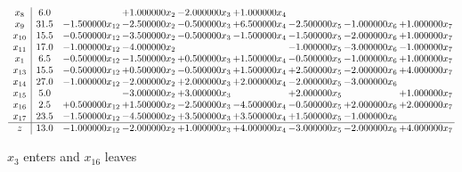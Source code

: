 \documentclass[10pt]{article}
\begin{document}
 \[\begin{array}{c| c c@{\hskip 2pt} c@{\hskip 2pt} c@{\hskip 2pt} c@{\hskip 2pt} c@{\hskip 2pt} c@{\hskip 2pt} c@{\hskip 2pt} }
 x_{8}   &  6.0  &   & + 1.000000 x_{2} & -2.000000 x_{3} & + 1.000000 x_{4} &    &    &   \\
 x_{9}   &  31.5 & -1.500000 x_{12} & -2.500000 x_{2} & -0.500000 x_{3} & + 6.500000 x_{4} & -2.500000 x_{5} & -1.000000 x_{6} & + 1.000000 x_{7}\\
 x_{10}   &  15.5 & -0.500000 x_{12} & -3.500000 x_{2} & -0.500000 x_{3} & -1.500000 x_{4} & -1.500000 x_{5} & -2.000000 x_{6} & + 1.000000 x_{7}\\
 x_{11}   &  17.0 & -1.000000 x_{12} & -4.000000 x_{2} &    &   & -1.000000 x_{5} & -3.000000 x_{6} & -1.000000 x_{7}\\
 x_{1}   &  6.5 & -0.500000 x_{12} & -1.500000 x_{2} & + 0.500000 x_{3} & + 1.500000 x_{4} & -0.500000 x_{5} & -1.000000 x_{6} & + 1.000000 x_{7}\\
 x_{13}   &  15.5 & -0.500000 x_{12} & + 0.500000 x_{2} & -0.500000 x_{3} & + 1.500000 x_{4} & + 2.500000 x_{5} & -2.000000 x_{6} & + 4.000000 x_{7}\\
 x_{14}   &  27.0 & -1.000000 x_{12} & -2.000000 x_{2} & + 2.000000 x_{3} & + 2.000000 x_{4} & -2.000000 x_{5} & -3.000000 x_{6} &   \\
 x_{15}   &  5.0  &   & -3.000000 x_{2} & + 3.000000 x_{3} &   & + 2.000000 x_{5} &   & + 1.000000 x_{7}\\
 x_{16}   &  2.5 & + 0.500000 x_{12} & + 1.500000 x_{2} & -2.500000 x_{3} & -4.500000 x_{4} & -0.500000 x_{5} & + 2.000000 x_{6} & + 2.000000 x_{7}\\
 x_{17}   &  23.5 & -1.500000 x_{12} & -4.500000 x_{2} & + 3.500000 x_{3} & + 3.500000 x_{4} & + 1.500000 x_{5} & -1.000000 x_{6} &   \\
\hline
z    &  13.0 & -1.000000 x_{12} & -2.000000 x_{2} & + 1.000000 x_{3} & + 4.000000 x_{4} & -3.000000 x_{5} & -2.000000 x_{6} & + 4.000000 x_{7}\\
\end{array}\]


 $ x_{3} $ enters and $ x_{16} $ leaves 
\end{document}
